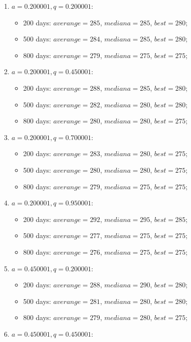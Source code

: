 \begin{enumerate}
\item $a= 0.200001, q= 0.200001$:
	\begin{itemize}
		\item 200 days: $averange = 285$, $mediana = 285$, $best = 280$;
		\item 500 days: $averange = 284$, $mediana = 285$, $best = 280$;
		\item 800 days: $averange = 279$, $mediana = 275$, $best = 275$;
	\end{itemize}
\item $a= 0.200001, q= 0.450001$:
	\begin{itemize}
		\item 200 days: $averange = 288$, $mediana = 285$, $best = 280$;
		\item 500 days: $averange = 282$, $mediana = 280$, $best = 280$;
		\item 800 days: $averange = 280$, $mediana = 280$, $best = 275$;
	\end{itemize}
\item $a= 0.200001, q= 0.700001$:
	\begin{itemize}
		\item 200 days: $averange = 283$, $mediana = 280$, $best = 275$;
		\item 500 days: $averange = 280$, $mediana = 280$, $best = 275$;
		\item 800 days: $averange = 279$, $mediana = 275$, $best = 275$;
	\end{itemize}
\item $a= 0.200001, q= 0.950001$:
	\begin{itemize}
		\item 200 days: $averange = 292$, $mediana = 295$, $best = 285$;
		\item 500 days: $averange = 277$, $mediana = 275$, $best = 275$;
		\item 800 days: $averange = 276$, $mediana = 275$, $best = 275$;
	\end{itemize}
\item $a= 0.450001, q= 0.200001$:
	\begin{itemize}
		\item 200 days: $averange = 288$, $mediana = 290$, $best = 280$;
		\item 500 days: $averange = 281$, $mediana = 280$, $best = 280$;
		\item 800 days: $averange = 279$, $mediana = 280$, $best = 275$;
	\end{itemize}
\item $a= 0.450001, q= 0.450001$:

\end{enumerate}

